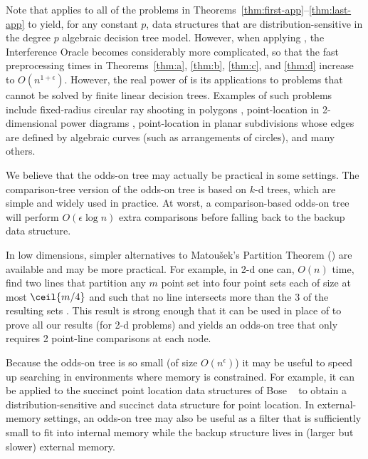 \documentclass{patmorin}
\begin{document}
Note that  applies to all of the problems
in Theorems~\ref{thm:first-app}--\ref{thm:last-app} to yield, for
any constant $p$, data structures that are distribution-sensitive
in the degree $p$ algebraic decision tree model.  However, when
applying , the Interference Oracle becomes
considerably more complicated, so that the fast preprocessing times in
Theorems~\ref{thm:a}, \ref{thm:b}, \ref{thm:c}, and \ref{thm:d} increase
to $O(n^{1+\epsilon})$.
However, the real power of  is its applications
to problems that cannot be solved by finite linear decision trees.
Examples of such problems include fixed-radius circular ray shooting in
polygons \cite{cceo04}, point-location in 2-dimensional power diagrams
\cite{a87}, point-location in planar subdivisions whose edges are defined
by algebraic curves (such as arrangements of circles), and many others.

We believe that the odds-on tree may actually be practical in some
settings.  The comparison-tree version of the odds-on tree is based on
$k$-d trees, which are simple and widely used in practice. At worst,
a comparison-based odds-on tree will perform $O(\epsilon\log n)$ extra
comparisons before falling back to the backup data structure.

In low dimensions, simpler alternatives to Matou\v{s}ek's Partition
Theorem () are available and may be more
practical.  For example, in 2-d one can, $O(n)$ time, find two lines
that partition any $m$ point set into four point sets each of size at
most $\ceil{m/4}$ and such that no line intersects more than the 3 of
the resulting sets \cite{m85}. This result is strong enough that it can
be used in place of  to prove all our results
(for 2-d problems) and yields an odds-on tree that only requires 2
point-line comparisons at each node.

Because the odds-on tree is so small (of size $O(n^\epsilon)$) it
may be useful to speed up searching in environments where memory is
constrained. For example, it can be applied to the succinct point
location data structures of Bose \etal\ \cite{bchmm09} to obtain a
distribution-sensitive and succinct data structure for point location.
In external-memory settings, an odds-on tree may also be useful as a
filter that is sufficiently small to fit into internal memory while the
backup structure lives in (larger but slower) external memory.






\end{document}
